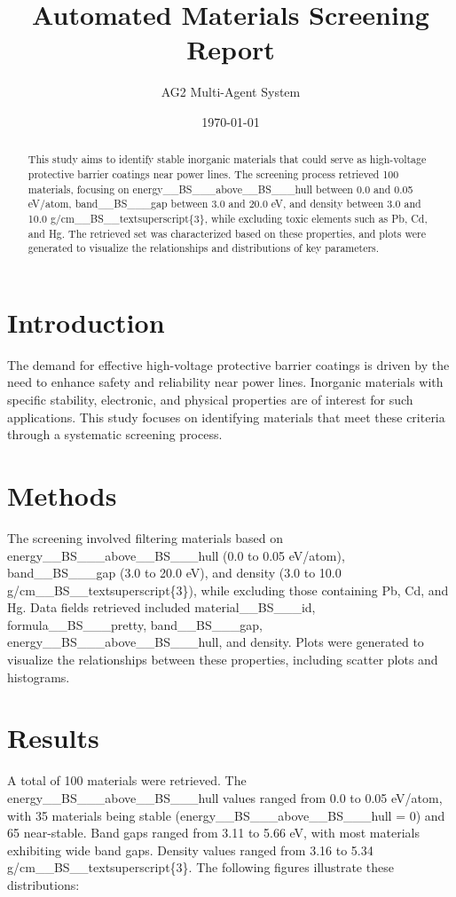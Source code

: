 \documentclass{article}
\title{Automated Materials Screening Report}
\author{AG2 Multi-Agent System}
\date{\today}
\begin{document}
\maketitle

\begin{abstract}
This study aims to identify stable inorganic materials that could serve as high-voltage protective barrier coatings near power lines. The screening process retrieved 100 materials, focusing on energy\_\_BS\_\_\_above\_\_BS\_\_\_hull between 0.0 and 0.05 eV/atom, band\_\_BS\_\_\_gap between 3.0 and 20.0 eV, and density between 3.0 and 10.0 g/cm\_\_BS\_\_textsuperscript\{3\}, while excluding toxic elements such as Pb, Cd, and Hg. The retrieved set was characterized based on these properties, and plots were generated to visualize the relationships and distributions of key parameters.
\end{abstract}

\section{Introduction}
The demand for effective high-voltage protective barrier coatings is driven by the need to enhance safety and reliability near power lines. Inorganic materials with specific stability, electronic, and physical properties are of interest for such applications. This study focuses on identifying materials that meet these criteria through a systematic screening process.

\section{Methods}
The screening involved filtering materials based on energy\_\_BS\_\_\_above\_\_BS\_\_\_hull (0.0 to 0.05 eV/atom), band\_\_BS\_\_\_gap (3.0 to 20.0 eV), and density (3.0 to 10.0 g/cm\_\_BS\_\_textsuperscript\{3\}), while excluding those containing Pb, Cd, and Hg. Data fields retrieved included material\_\_BS\_\_\_id, formula\_\_BS\_\_\_pretty, band\_\_BS\_\_\_gap, energy\_\_BS\_\_\_above\_\_BS\_\_\_hull, and density. Plots were generated to visualize the relationships between these properties, including scatter plots and histograms.

\section{Results}
A total of 100 materials were retrieved. The energy\_\_BS\_\_\_above\_\_BS\_\_\_hull values ranged from 0.0 to 0.05 eV/atom, with 35 materials being stable (energy\_\_BS\_\_\_above\_\_BS\_\_\_hull = 0) and 65 near-stable. Band gaps ranged from 3.11 to 5.66 eV, with most materials exhibiting wide band gaps. Density values ranged from 3.16 to 5.34 g/cm\_\_BS\_\_textsuperscript\{3\}. The following figures illustrate these distributions:
\end{document}
